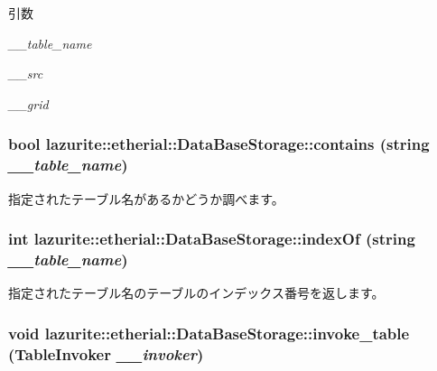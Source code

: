 \begin{DoxyParams}{引数}
\item[{\em \_\-\_\-table\_\-name}]\item[{\em \_\-\_\-src}]\item[{\em \_\-\_\-grid}]\end{DoxyParams}
\hypertarget{classlazurite_1_1etherial_1_1_data_base_storage_acb77614ca2b4481f31c86acaf305acd1}{
\subsubsection[{contains}]{\setlength{\rightskip}{0pt plus 5cm}bool lazurite::etherial::DataBaseStorage::contains (string {\em \_\-\_\-table\_\-name})}}
\label{classlazurite_1_1etherial_1_1_data_base_storage_acb77614ca2b4481f31c86acaf305acd1}
指定されたテーブル名があるかどうか調べます。 \hypertarget{classlazurite_1_1etherial_1_1_data_base_storage_ab5f5412eaedc79f9845ce2e9d085d4cd}{
\subsubsection[{indexOf}]{\setlength{\rightskip}{0pt plus 5cm}int lazurite::etherial::DataBaseStorage::indexOf (string {\em \_\-\_\-table\_\-name})}}
\label{classlazurite_1_1etherial_1_1_data_base_storage_ab5f5412eaedc79f9845ce2e9d085d4cd}
指定されたテーブル名のテーブルのインデックス番号を返します。 \hypertarget{classlazurite_1_1etherial_1_1_data_base_storage_a4799451dac40d2f2939709bb84cb6212}{
\subsubsection[{invoke\_\-table}]{\setlength{\rightskip}{0pt plus 5cm}void lazurite::etherial::DataBaseStorage::invoke\_\-table (TableInvoker {\em \_\-\_\-invoker})}}
